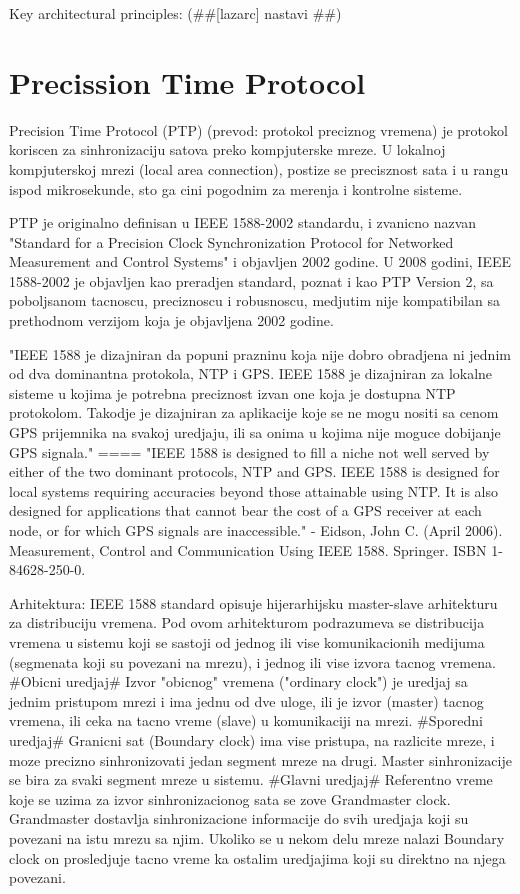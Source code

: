 \documentclass[a4paper,12pt, master]{etf}
\begin{document}
	Key architectural principles:
	(\#\#[lazarc] nastavi \#\#)

	\section{Precission Time Protocol}
	Precision Time Protocol (PTP) (prevod: protokol preciznog vremena) je protokol
	koriscen za sinhronizaciju satova preko kompjuterske mreze. U lokalnoj
	kompjuterskoj mrezi (local area connection), postize se precisznost sata i u rangu
	ispod mikrosekunde, sto ga cini pogodnim za merenja i kontrolne sisteme.

	PTP je originalno definisan u IEEE 1588-2002 standardu, i zvanicno nazvan
	"Standard for a Precision Clock Synchronization Protocol for Networked Measurement
	and Control Systems" i objavljen 2002 godine. U 2008 godini, IEEE 1588-2002 je
	objavljen kao preradjen standard, poznat i kao PTP Version 2, sa poboljsanom tacnoscu,
	preciznoscu i robusnoscu, medjutim nije kompatibilan sa prethodnom verzijom koja je objavljena
	2002 godine.

	"IEEE 1588 je dizajniran da popuni prazninu koja nije dobro obradjena ni jednim od dva
	dominantna protokola, NTP i GPS. IEEE 1588 je dizajniran za lokalne sisteme u kojima je
	potrebna preciznost izvan one koja je dostupna NTP protokolom. Takodje je dizajniran za
	aplikacije koje se ne mogu nositi sa cenom GPS prijemnika na svakoj uredjaju, ili sa onima u
	kojima nije moguce dobijanje GPS signala."
	====
	"IEEE 1588 is designed to fill a niche not well served by either of the two dominant protocols,
	NTP and GPS. IEEE 1588 is designed for local systems requiring accuracies beyond those
	attainable using NTP. It is also designed for applications that cannot bear the cost of a GPS
	receiver at each node, or for which GPS signals are inaccessible." - Eidson, John C. (April
	2006). Measurement, Control and Communication Using IEEE 1588. Springer. ISBN 1-84628-250-0.

	Arhitektura:
	IEEE 1588 standard opisuje hijerarhijsku master-slave arhitekturu za distribuciju vremena. Pod
	ovom arhitekturom podrazumeva se distribucija vremena u sistemu koji se sastoji od jednog ili
	vise komunikacionih medijuma (segmenata koji su povezani na mrezu), i jednog ili vise izvora
	tacnog vremena. \#Obicni uredjaj\# Izvor "obicnog" vremena ("ordinary clock") je uredjaj sa
	jednim pristupom mrezi i ima jednu od dve uloge, ili je izvor  (master) tacnog vremena, ili
	ceka na tacno vreme (slave) u komunikaciji na mrezi. \#Sporedni uredjaj\# Granicni sat (Boundary
	clock) ima vise pristupa, na razlicite mreze, i moze precizno sinhronizovati jedan segment
	mreze na drugi. Master sinhronizacije se bira za svaki segment mreze u sistemu. \#Glavni
	uredjaj\# Referentno vreme koje se uzima za izvor sinhronizacionog sata se zove Grandmaster
	clock. Grandmaster dostavlja sinhronizacione informacije do svih uredjaja koji su povezani na
	istu mrezu sa njim. Ukoliko se u nekom delu mreze nalazi Boundary clock on prosledjuje tacno
	vreme ka ostalim uredjajima koji su direktno na njega povezani.
\end{document}
